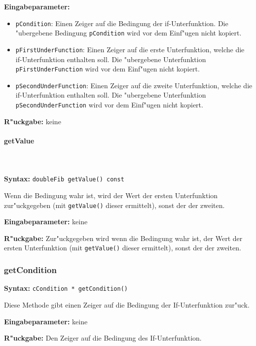 \bigskip\noindent
\textbf{Eingabeparameter:}
\begin{itemize}
 \item \verb|pCondition|: Einen Zeiger auf die Bedingung der if-Unterfunktion. Die "ubergebene Bedingung \verb|pCondition| wird vor dem Einf"ugen nicht kopiert.
 \item \verb|pFirstUnderFunction|: Einen Zeiger auf die erste Unterfunktion, welche die if-Unterfunktion enthalten soll. Die "ubergebene Unterfunktion \verb|pFirstUnderFunction| wird vor dem Einf"ugen nicht kopiert.
 \item \verb|pSecondUnderFunction|: Einen Zeiger auf die zweite Unterfunktion, welche die if-Unterfunktion enthalten soll. Die "ubergebene Unterfunktion \verb|pSecondUnderFunction| wird vor dem Einf"ugen nicht kopiert.
\end{itemize}

\bigskip\noindent
\textbf{R"uckgabe:} keine


\paragraph{getValue}

\ \\\\\noindent
\textbf{Syntax:} \verb|doubleFib getValue() const|

\bigskip\noindent
Wenn die Bedingung wahr ist, wird der Wert der ersten Unterfunktion zur"uckgegeben (mit \verb|getValue()| dieser ermittelt), sonst der der zweiten.

\bigskip\noindent
\textbf{Eingabeparameter:} keine

\bigskip\noindent
\textbf{R"uckgabe:} Zur"uckgegeben wird wenn die Bedingung wahr ist, der Wert der ersten Unterfunktion (mit \verb|getValue()| dieser ermittelt), sonst der der zweiten.


\subsubsection{getCondition}

\textbf{Syntax:} \verb|cCondition * getCondition()|

\bigskip\noindent
Diese Methode gibt einen Zeiger auf die Bedingung der If-Unterfunktion zur"uck.

\bigskip\noindent
\textbf{Eingabeparameter:} keine

\bigskip\noindent
\textbf{R"uckgabe:} Den Zeiger auf die Bedingung des If-Unterfunktion.


